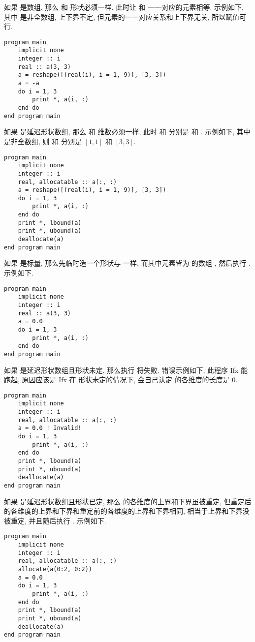 如果  是数组, 那么  和  形状必须一样. 此时让  和  一一对应的元素相等. 示例如下, 其中  是非全数组, 上下界不定, 但元素的一一对应关系和上下界无关, 所以赋值可行.
\begin{lstlisting}
program main
    implicit none
    integer :: i
    real :: a(3, 3)
    a = reshape([(real(i), i = 1, 9)], [3, 3])
    a = -a
    do i = 1, 3
        print *, a(i, :)
    end do
end program main
\end{lstlisting}

如果  是延迟形状数组, 那么  和  维数必须一样, 此时  和  分别是  和 . 示例如下, 其中  是非全数组, 则  和  分别是 $[1,1]$ 和 $[3,3]$.
\begin{lstlisting}
program main
    implicit none
    integer :: i
    real, allocatable :: a(:, :)
    a = reshape([(real(i), i = 1, 9)], [3, 3])
    do i = 1, 3
        print *, a(i, :)
    end do
    print *, lbound(a)
    print *, ubound(a)
    deallocate(a)
end program main
\end{lstlisting}

如果  是标量, 那么先临时造一个形状与  一样, 而其中元素皆为  的数组 , 然后执行 . 示例如下.
\begin{lstlisting}
program main
    implicit none
    integer :: i
    real :: a(3, 3)
    a = 0.0
    do i = 1, 3
        print *, a(i, :)
    end do
end program main
\end{lstlisting}
如果  是延迟形状数组且形状未定, 那么执行  将失败. 错误示例如下, 此程序 Ifx 能跑起, 原因应该是 Ifx 在  形状未定的情况下, 会自己认定  的各维度的长度是 $0$.
\begin{lstlisting}
program main
    implicit none
    integer :: i
    real, allocatable :: a(:, :)
    a = 0.0 ! Invalid!
    do i = 1, 3
        print *, a(i, :)
    end do
    print *, lbound(a)
    print *, ubound(a)
    deallocate(a)
end program main
\end{lstlisting}
如果  是延迟形状数组且形状已定, 那么  的各维度的上界和下界虽被重定, 但重定后的各维度的上界和下界和重定前的各维度的上界和下界相同, 相当于上界和下界没被重定, 并且随后执行 . 示例如下.
\begin{lstlisting}
program main
    implicit none
    integer :: i
    real, allocatable :: a(:, :)
    allocate(a(0:2, 0:2))
    a = 0.0
    do i = 1, 3
        print *, a(i, :)
    end do
    print *, lbound(a)
    print *, ubound(a)
    deallocate(a)
end program main
\end{lstlisting}

